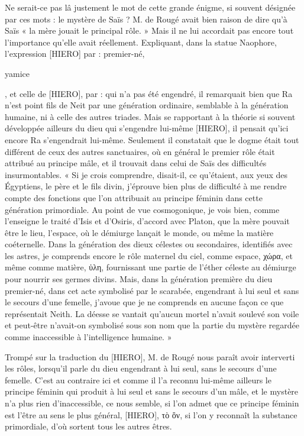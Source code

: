 \documentclass[a4paper, 11pt, oneside]{article}
\begin{document}
Ne serait-ce pas lâ justement le mot de cette grande énigme, si souvent désignée par ces mots : le mystère de Saïs ? M. de Rougé avait bien raison de dire qu'à Saïs « la mère jouait le principal rôle. » Mais il ne lui accordait pas encore tout l'importance qu’elle avait réellement. Expliquant, dans la statue Naophore, l'expression [HIERO] par : premier-né, \begin{coptic}yamice\end{coptic}, et celle de [HIERO], par : qui n'a pas été engendré, il remarquait bien que Ra n'est point fils de Neit par une génération ordinaire, semblable à la génération humaine, ni à celle des autres triades. Mais se rapportant à la théorie si souvent développée ailleurs du dieu qui s'engendre lui-même [HIERO], il pensait qu'ici encore Ra s'engendrait lui-même. Seulement il constatait que le dogme était tout différent de ceux des autres sanctuaires, où en général le premier rôle était attribué au principe mâle, et il trouvait dans celui de Saïs des difficultés insurmontables. « Si je crois comprendre, disait-il, ce qu'étaient, aux yeux des Égyptiens, le père et le fils divin, j'éprouve bien plus de difficulté à me rendre compte des fonctions que l'on attribuait au principe féminin dans cette génération primordiale. Au point de vue cosmogonique, je vois bien, comme l'enseigne le traité d'Isis et d'Osiris, d'accord avec Platon, que la mère pouvait être le lieu, l'espace, où le démiurge lançait le monde, ou même la matière coéternelle. Dans la génération des dieux célestes ou secondaires, identifiés avec les astres, je comprends encore le rôle maternel du ciel, comme espace, χώρα, et même comme matière, ὑλη, fournissant une partie de l'éther céleste au démiurge pour nourrir ses germes divins. Mais, dans la génération première du dieu premier-né, dans cet acte symbolisé par le scarabée, engendrant à lui seul et sans le secours d'une femelle, j'avoue que je ne comprends en aucune façon ce que représentait Neith. La déesse se vantait qu'aucun mortel n'avait soulevé son voile et peut-être n'avait-on symbolisé sous son nom que la partie du mystère regardée comme inaccessible à l'intelligence humaine. »

Trompé sur la traduction du [HIERO], M. de Rougé nous paraît avoir interverti les rôles, lorsqu’il parle du dieu engendrant à lui seul, sans le secours d'une femelle. C'est au contraire ici et comme il l'a reconnu lui-même ailleurs le principe féminin qui produit à lui seul et sans le secours d'un mâle, et le mystère n'a plus rien d'inaccessible, ce nous semble, si l'on admet que ce principe féminin est l'être au sens le plus général, [HIERO], τὸ ὂν, si l'on y reconnaît la substance primordiale, d'où sortent tous les autres êtres.
\end{document}
